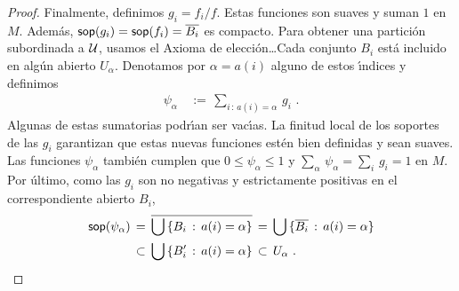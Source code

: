 \begin{proof}
	Finalmente, definimos $g_i=f_i/f$. Estas funciones son suaves y suman
	$1$ en $M$. Adem\'{a}s, $\soporte{g_i}=\soporte{f_i}=\clos{B_i}$ es
	compacto. Para obtener una partici\'{o}n subordinada a $\cal U$, usamos
	el Axioma de elecci\'{o}n\dots Cada conjunto $B_i$ est\'{a} incluido en
	alg\'{u}n abierto $U_\alpha$. Denotamos por $\alpha=a(i)$ alguno de
	estos \'{\i}ndices y definimos
	\begin{align*}
		\psi_\alpha & \,:=\,\sum_{i\,:\,a(i)=\alpha}\,g_i
		\text{ .}
	\end{align*}
	Algunas de estas sumatorias podr\'{\i}an ser vac\'{\i}as. La finitud
	local de los soportes de las $g_i$ garantizan que estas nuevas
	funciones est\'{e}n bien definidas y sean suaves. Las funciones
	$\psi_\alpha$ tambi\'{e}n cumplen que $0\leq\psi_\alpha\leq 1$ y
	$\sum_\alpha\,\psi_\alpha=\sum_i\,g_i=1$ en $M$. Por \'{u}ltimo,
	como las $g_i$ son no negativas y estrictamente positivas en el
	correspondiente abierto $B_i$,
	\begin{align*}
		\soporte{\psi_\alpha} & \,=\,\clos{%
				\bigcup\,\{B_i\,:\,a(i)=\alpha\}} \,=\,
			\bigcup\,\{\clos{B_i}\,:\,a(i)=\alpha\} \\
		& \,\subset\,\bigcup\,\{B_i'\,:\,a(i)=\alpha\}\,\subset\,
			U_\alpha
		\text{ .}
	\end{align*}
\end{proof}
